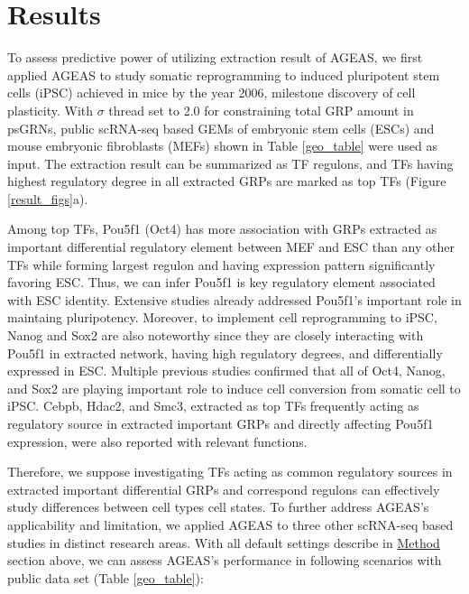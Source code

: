 \documentclass[fleqn,10pt]{wlscirep}
\begin{document}
\section*{Results}
  \label{res}
  To assess predictive power of utilizing extraction result of AGEAS, we first applied AGEAS to study somatic reprogramming to induced pluripotent stem cells (iPSC) achieved in mice by the year 2006, \cite{yamanaka_2006} milestone discovery of cell plasticity. \cite{cell_repro_review}
  With $\sigma$ thread set to 2.0 for constraining total GRP amount in psGRNs, public scRNA-seq based GEMs of embryonic stem cells (ESCs) and mouse embryonic fibroblasts (MEFs) shown in Table \ref{geo_table} were used as input.
  The extraction result can be summarized as TF regulons, and TFs having highest regulatory degree in all extracted GRPs are marked as top TFs (Figure \ref{result_figs}a).

  Among top TFs, Pou5f1 (Oct4) has more association with GRPs extracted as important differential regulatory element between MEF and ESC than any other TFs while forming largest regulon and having expression pattern significantly favoring ESC.
  Thus, we can infer Pou5f1 is key regulatory element associated with ESC identity.
  Extensive studies already addressed Pou5f1's important role in maintaing pluripotency. \cite{niwa_2007, oct4_1, oct4_2}
  Moreover, to implement cell reprogramming to iPSC, Nanog and Sox2 are also noteworthy since they are closely interacting with Pou5f1 in extracted network, having high regulatory degrees, and differentially expressed in ESC.
  Multiple previous studies confirmed that all of Oct4, Nanog, and Sox2 are playing important role to induce cell conversion from somatic cell to iPSC. \cite{yamanaka_2006, ips7f, ipsOK, oct4_nanog_sox2_lin28, oct4_nanog_sox2}
  Cebpb, Hdac2, and Smc3, extracted as top TFs frequently acting as regulatory source in extracted important GRPs and directly affecting Pou5f1 expression, were also reported with relevant functions. \cite{cebpb_ipsc, hdac2_ipsc, rad21_smc3_esc}

  Therefore, we suppose investigating TFs acting as common regulatory sources in extracted important differential GRPs and correspond regulons can effectively study differences between cell types cell states.
  To further address AGEAS's applicability and limitation, we applied AGEAS to three other scRNA-seq based studies in distinct research areas.
  With all default settings describe in \hyperref[method]{Method} section above, we can assess AGEAS's performance in following scenarios with public data set (Table \ref{geo_table}):
\end{document}
